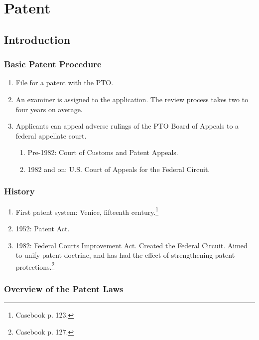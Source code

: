 \section{Patent}

\subsection{Introduction}

\subsubsection{Basic Patent Procedure}

\begin{enumerate}
    \item File for a patent with the PTO.
    \item An examiner is assigned to the application. The review process takes 
    two to four years on average.
    \item Applicants can appeal adverse rulings of the PTO Board of Appeals to a 
    federal appellate court.
    \begin{enumerate}
        \item Pre-1982: Court of Customs and Patent Appeals.
        \item 1982 and on: U.S. Court of Appeals for the Federal Circuit.
    \end{enumerate}
\end{enumerate}

\subsubsection{History}

\begin{enumerate}
    \item First patent system: Venice, fifteenth century.\footnote{Casebook p. 
    123.}
    \item 1952: Patent Act.
    \item 1982: Federal Courts Improvement Act. Created the Federal Circuit. 
    Aimed to unify patent doctrine, and has had the effect of strengthening 
    patent protections.\footnote{Casebook p. 127.}
\end{enumerate}

\subsubsection{Overview of the Patent Laws}

